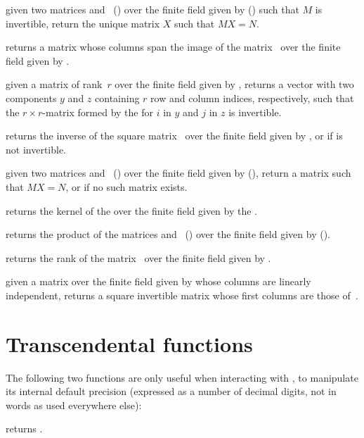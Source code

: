  given two matrices 
and~ () over the finite field given by 
() such that $M$ is invertible, return the unique matrix
$X$ such that $MX=N$.

 returns a matrix whose columns
span the image of the matrix~ over the finite field given by
.

 given a matrix  of
rank~$r$ over the finite field given by , returns a vector
with two  components $y$ and $z$ containing $r$ row and
column indices, respectively, such that the $r\times r$-matrix formed
by the  for $i$ in $y$ and $j$ in $z$ is invertible.

 returns the inverse of the square
matrix~ over the finite field given by , or 
if  is not invertible.

 given two matrices
 and~ () over the finite field given by
 (), return a matrix  such that $MX=N$, or
 if no such matrix exists.

 returns the kernel of the 
 over the finite field given by the  .

 returns the product of the
matrices  and~ () over the finite field given
by  ().

 returns the rank of the
matrix~ over the finite field given by .

 given a matrix  over the
finite field given by  whose columns are linearly independent,
returns a square invertible matrix whose first columns are those
of~.

\section{Transcendental functions}

The following two functions are only useful when interacting with ,
to manipulate its internal default precision (expressed as a number of
decimal digits, not in words as used everywhere else):

 returns .

